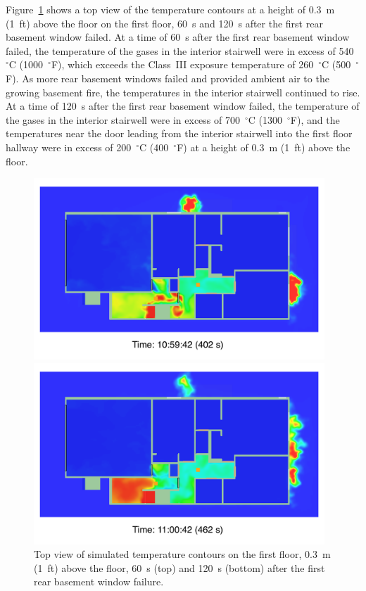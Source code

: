\documentclass[12pt,oneside]{book}
\begin{document}
Figure~\ref{fig:smv_flow_path_top_2} shows a top view of the temperature contours at a height of 0.3~m (1~ft) above the floor on the first floor, 60~s and 120~s after the first rear basement window failed. At a time of 60~s after the first rear basement window failed, the temperature of the gases in the interior stairwell were in excess of 540~$^{\circ}$C (1000~$^{\circ}$F), which exceeds the Class~III exposure temperature of 260~$^{\circ}$C (500~$^{\circ}$F). As more rear basement windows failed and provided ambient air to the growing basement fire, the temperatures in the interior stairwell continued to rise. At a time of 120~s after the first rear basement window failed, the temperature of the gases in the interior stairwell were in excess of 700~$^{\circ}$C (1300~$^{\circ}$F), and the temperatures near the door leading from the interior stairwell into the first floor hallway were in excess of 200~$^{\circ}$C (400~$^{\circ}$F) at a height of 0.3~m (1~ft) above the floor.


\clearpage


\begin{figure}[!ht]
\includegraphics[width=4.3in]{../Figures/SMV_Top_Temp_402_s}


\includegraphics[width=4.3in]{../Figures/SMV_Top_Temp_462_s}


\caption[Simulated temperature contours on the first floor after basement window failure.]
{Top view of simulated temperature contours on the first floor, 0.3~m (1~ft) above the floor, 60~s (top) and 120~s (bottom) after the first rear basement window failure.}
\label{fig:smv_flow_path_top_2}
\end{figure}
\end{document}
